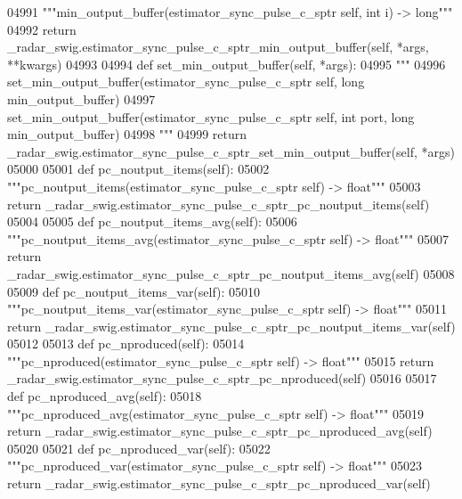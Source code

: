 \begin{DoxyCode}
{{{{{{{{{{{{{{{{{04991         \textcolor{stringliteral}{"""min\_output\_buffer(estimator\_sync\_pulse\_c\_sptr self, int i) -> long"""}
04992         \textcolor{keywordflow}{return} \_radar\_swig.estimator\_sync\_pulse\_c\_sptr\_min\_output\_buffer(self, *args, **kwargs)
04993 
04994     \textcolor{keyword}{def }set_min_output_buffer(self, *args):
04995         \textcolor{stringliteral}{"""}
04996 \textcolor{stringliteral}{        set\_min\_output\_buffer(estimator\_sync\_pulse\_c\_sptr self, long min\_output\_buffer)}
04997 \textcolor{stringliteral}{        set\_min\_output\_buffer(estimator\_sync\_pulse\_c\_sptr self, int port, long min\_output\_buffer)}
04998 \textcolor{stringliteral}{        """}
04999         \textcolor{keywordflow}{return} \_radar\_swig.estimator\_sync\_pulse\_c\_sptr\_set\_min\_output\_buffer(self, *args)
05000 
05001     \textcolor{keyword}{def }pc_noutput_items(self):
05002         \textcolor{stringliteral}{"""pc\_noutput\_items(estimator\_sync\_pulse\_c\_sptr self) -> float"""}
05003         \textcolor{keywordflow}{return} \_radar\_swig.estimator\_sync\_pulse\_c\_sptr\_pc\_noutput\_items(self)
05004 
05005     \textcolor{keyword}{def }pc_noutput_items_avg(self):
05006         \textcolor{stringliteral}{"""pc\_noutput\_items\_avg(estimator\_sync\_pulse\_c\_sptr self) -> float"""}
05007         \textcolor{keywordflow}{return} \_radar\_swig.estimator\_sync\_pulse\_c\_sptr\_pc\_noutput\_items\_avg(self)
05008 
05009     \textcolor{keyword}{def }pc_noutput_items_var(self):
05010         \textcolor{stringliteral}{"""pc\_noutput\_items\_var(estimator\_sync\_pulse\_c\_sptr self) -> float"""}
05011         \textcolor{keywordflow}{return} \_radar\_swig.estimator\_sync\_pulse\_c\_sptr\_pc\_noutput\_items\_var(self)
05012 
05013     \textcolor{keyword}{def }pc_nproduced(self):
05014         \textcolor{stringliteral}{"""pc\_nproduced(estimator\_sync\_pulse\_c\_sptr self) -> float"""}
05015         \textcolor{keywordflow}{return} \_radar\_swig.estimator\_sync\_pulse\_c\_sptr\_pc\_nproduced(self)
05016 
05017     \textcolor{keyword}{def }pc_nproduced_avg(self):
05018         \textcolor{stringliteral}{"""pc\_nproduced\_avg(estimator\_sync\_pulse\_c\_sptr self) -> float"""}
05019         \textcolor{keywordflow}{return} \_radar\_swig.estimator\_sync\_pulse\_c\_sptr\_pc\_nproduced\_avg(self)
05020 
05021     \textcolor{keyword}{def }pc_nproduced_var(self):
05022         \textcolor{stringliteral}{"""pc\_nproduced\_var(estimator\_sync\_pulse\_c\_sptr self) -> float"""}
05023         \textcolor{keywordflow}{return} \_radar\_swig.estimator\_sync\_pulse\_c\_sptr\_pc\_nproduced\_var(self)
}}}}}}}}}}}}}}}}}
\end{DoxyCode}
